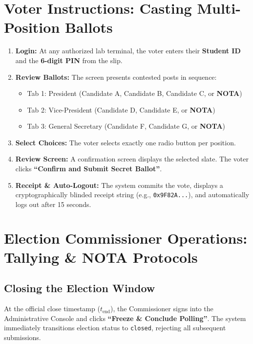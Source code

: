 \documentclass[12pt,a4paper,oneside]{report}
\begin{document}
\section{Voter Instructions: Casting Multi-Position Ballots}
\begin{enumerate}
    \item \textbf{Login:} At any authorized lab terminal, the voter enters their \textbf{Student ID} and the \textbf{6-digit PIN} from the slip.
    \item \textbf{Review Ballots:} The screen presents contested posts in sequence:
    \begin{itemize}
        \item Tab 1: President (Candidate A, Candidate B, Candidate C, or \textbf{NOTA})
        \item Tab 2: Vice-President (Candidate D, Candidate E, or \textbf{NOTA})
        \item Tab 3: General Secretary (Candidate F, Candidate G, or \textbf{NOTA})
    \end{itemize}
    \item \textbf{Select Choices:} The voter selects exactly one radio button per position.
    \item \textbf{Review Screen:} A confirmation screen displays the selected slate. The voter clicks \textbf{``Confirm and Submit Secret Ballot''}.
    \item \textbf{Receipt \& Auto-Logout:} The system commits the vote, displays a cryptographically blinded receipt string (e.g., \texttt{0x9F82A...}), and automatically logs out after 15 seconds.
\end{enumerate}

\section{Election Commissioner Operations: Tallying \& NOTA Protocols}
\subsection{Closing the Election Window}
At the official close timestamp ($t_{\text{end}}$), the Commissioner signs into the Administrative Console and clicks \textbf{``Freeze \& Conclude Polling''}. The system immediately transitions election status to \texttt{closed}, rejecting all subsequent submissions.
\end{document}
